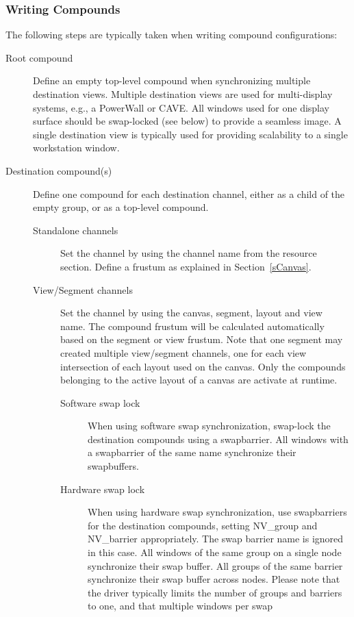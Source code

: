 \documentclass[10pt,a4]{scrartcl}
\newcommand{\sref}[1]{Section~\ref{#1}}
\begin{document}
\subsubsection{Writing Compounds}
The following steps are typically taken when writing compound
configurations:
\begin{description}
\item [Root compound] Define an empty top-level compound when
  synchronizing multiple destination views. Multiple destination views
  are used for multi-display systems, e.g., a PowerWall or CAVE. All
  windows used for one display surface should be swap-locked (see below)
  to provide a seamless image. A single destination view is typically
  used for providing scalability to a single workstation window.
\item [Destination compound(s)] Define one compound for each destination
  channel, either as a child of the empty group, or as a top-level
  compound.
  \begin{description}
  \item[Standalone channels] Set the channel by using the channel name
    from the resource section. Define a frustum as explained in
    \sref{sCanvas}.
  \item[View/Segment channels] Set the channel by using the canvas,
    segment, layout and view name. The compound frustum will be
    calculated automatically based on the segment or view frustum. Note
    that one segment may created multiple view/segment channels, one for
    each view intersection of each layout used on the canvas. Only the
    compounds belonging to the active layout of a canvas are activate at
    runtime.
    \begin{description}
    \item [Software swap lock] When using software swap synchronization,
      swap-lock the destination compounds using a swapbarrier. All
      windows with a swapbarrier of the same name synchronize their
      swapbuffers.
    \item [Hardware swap lock] When using hardware swap synchronization,
      use swapbarriers for the destination compounds, setting
      \textsf{NV\_group} and \textsf{NV\_barrier} appropriately. The
      swap barrier name is ignored in this case. All windows of the same
      group on a single node synchronize their swap buffer. All groups
      of the same barrier synchronize their swap buffer across
      nodes. Please note that the driver typically limits the number of
      groups and barriers to one, and that multiple windows per swap

\end{description}
\end{description}
\end{description}
\end{document}
